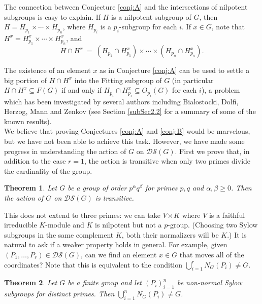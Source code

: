 \documentclass[11pt]{amsart}
\numberwithin{equation}{section}
\newtheorem{theorem}{Theorem}[section]
\theoremstyle{definition}
\theoremstyle{remark}
\newcommand{\DS}{\mathcal{DS}}
\begin{document}
The connection between Conjecture \ref{conj:A} and
the intersections of nilpotent subgroups is easy to explain.
If $H$ is a nilpotent subgroup of $G$, then $H = H_{p_1} \times \cdots \times H_{p_n}$,
where $H_{p_i}$ is a $p_i$-subgroup for each $i$.
If $x \in G$, note that $H^x = H_{p_1}^x \times \cdots \times H_{p_n}^x$, and
$$ H \cap H^x \> = \> 
(H_{p_1} \cap H_{p_1}^x) \times \cdots \times (H_{p_n} \cap H_{p_n}^x) . $$

The existence of an element $x$
as in Conjecture \ref{conj:A} can be used to settle a big portion of $H \cap H^x$ into the Fitting subgroup of $G$
(in particular $H \cap H^x \subseteq F(G)$ if and only if $H_{p_i} \cap H_{p_i}^x \subseteq O_{p_i}(G)$ for each $i$),
a problem which has been investigated by several authors including
Bialostocki, Dolfi, Herzog, Mann and Zenkov \cite{Bia75,Dol05,Her71,Man71,Zen94}
(see Section \ref{subSec2.2} for a summary of some of the known results).\\

We believe that proving Conjectures \ref{conj:A} and \ref{conj:B} would be marvelous,
but we have not been able to achieve this task.
However, we have made some progress in understanding the action of $G$ on $\DS(G)$.
First we prove that, in addition to the case $r=1$,
the action is transitive when only two primes divide the cardinality of the group.

\begin{theorem} \label{thTwoPrimes}
Let $G$ be a group of order $p^\alpha q^\beta$ for primes $p,q$ and $\alpha,\beta \geq 0$.
Then the action of $G$ on $\DS(G)$ is transitive.
\end{theorem}

This does not extend to three primes:
we can take $V \rtimes K$ where $V$ is a faithful irreducible $K$-module
and $K$ is nilpotent but not a $p$-group.
(Choosing two Sylow subgroups in the same complement $K$, both their normalizers will be $K$.)
It is natural to ask if a weaker property holds in general.
For example, given $(P_1,\ldots,P_r) \in \DS(G)$,
can we find an element $x \in G$ that moves all of the coordinates?
Note that this is equivalent to the condition $\bigcup_{i=1}^r N_G(P_i) \neq G$.

\begin{theorem} \label{thUnion} 
Let $G$ be a finite group and let $(P_i)_{i=1}^n$ be non-normal Sylow subgroups for distinct primes.
Then $\bigcup_{i=1}^n N_G(P_i) \neq G$.
\end{theorem} 
\end{document}
